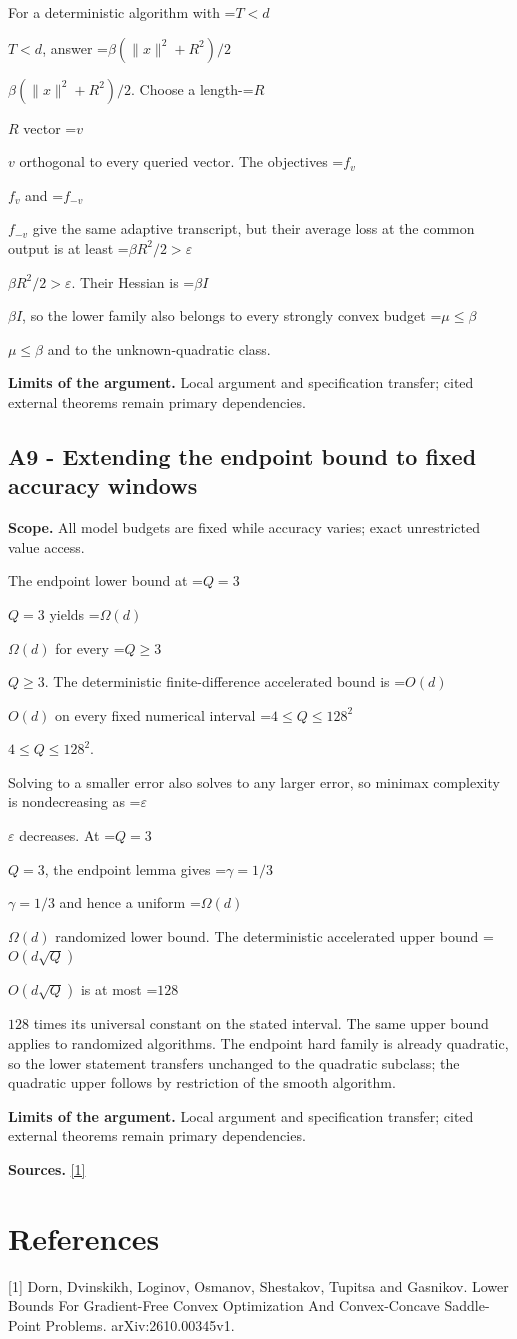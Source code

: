 \documentclass[10pt,a4paper]{article}
\newcommand{\AtlasMath}[1]{\par\begingroup\centering\setbox0=\hbox{$\displaystyle #1$}\ifdim\wd0>1.4\linewidth\typeout{ATLAS WIDE FORMULA: \the\wd0}\fi\ifdim\wd0>\linewidth\resizebox{\linewidth}{!}{\box0}\else\box0\fi\par\endgroup}
\newcommand{\AtlasInlineMath}[1]{\begingroup\setbox0=\hbox{$#1$}\ifdim\wd0>.4\linewidth\endgroup\AtlasMath{#1}\else\endgroup$#1$\fi}
\begin{document}
For a deterministic algorithm with \AtlasInlineMath{T<d}, answer \AtlasInlineMath{\beta(\|x\|^2+R^2)/2}. Choose a length-\AtlasInlineMath{R} vector \AtlasInlineMath{v} orthogonal to every queried vector. The objectives \AtlasInlineMath{f_v} and \AtlasInlineMath{f_{-v}} give the same adaptive transcript, but their average loss at the common output is at least \AtlasInlineMath{\beta R^2/2>\varepsilon}. Their Hessian is \AtlasInlineMath{\beta I}, so the lower family also belongs to every strongly convex budget \AtlasInlineMath{\mu\le\beta} and to the unknown-quadratic class.

\textbf{Limits of the argument.} Local argument and specification transfer; cited external theorems remain primary dependencies.

\subsection{A9 - Extending the endpoint bound to fixed accuracy windows}
\textbf{Scope.} All model budgets are fixed while accuracy varies; exact unrestricted value access.

The endpoint lower bound at \AtlasInlineMath{Q=3} yields \AtlasInlineMath{\Omega(d)} for every \AtlasInlineMath{Q\ge3}. The deterministic finite-difference accelerated bound is \AtlasInlineMath{O(d)} on every fixed numerical interval \AtlasInlineMath{4\le Q\le128^2}.

Solving to a smaller error also solves to any larger error, so minimax complexity is nondecreasing as \AtlasInlineMath{\varepsilon} decreases. At \AtlasInlineMath{Q=3}, the endpoint lemma gives \AtlasInlineMath{\gamma=1/3} and hence a uniform \AtlasInlineMath{\Omega(d)} randomized lower bound. The deterministic accelerated upper bound \AtlasInlineMath{O(d\sqrt Q)} is at most \AtlasInlineMath{128} times its universal constant on the stated interval. The same upper bound applies to randomized algorithms. The endpoint hard family is already quadratic, so the lower statement transfers unchanged to the quadratic subclass; the quadratic upper follows by restriction of the smooth algorithm.

\textbf{Limits of the argument.} Local argument and specification transfer; cited external theorems remain primary dependencies.

\textbf{Sources.} \href{https://arxiv.org/html/2610.00345v1}{[1]}

\section{References}
[1] Dorn, Dvinskikh, Loginov, Osmanov, Shestakov, Tupitsa and Gasnikov. Lower Bounds For Gradient-Free Convex Optimization And Convex-Concave Saddle-Point Problems. arXiv:2610.00345v1.
\end{document}
